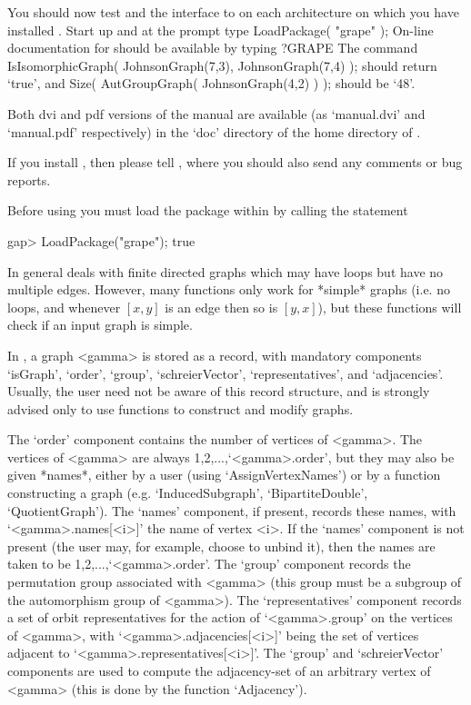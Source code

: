 You should now test {\GRAPE} and the interface to {\nauty} on each
architecture on which you have installed {\GRAPE}. Start up {\GAP}
and at the prompt type
\begintt
LoadPackage( "grape" );
\endtt
On-line documentation for {\GRAPE} should be available by typing 
\begintt
?GRAPE
\endtt
The command
\begintt
IsIsomorphicGraph( JohnsonGraph(7,3), JohnsonGraph(7,4) );
\endtt
should return `true', and 
\begintt
Size( AutGroupGraph( JohnsonGraph(4,2) ) );
\endtt
should be `48'.

Both dvi and pdf versions of the {\GRAPE} manual are available
(as `manual.dvi' and `manual.pdf' respectively) in the `doc' directory
of the home directory of {\GRAPE}.

If you install {\GRAPE}, then please tell ,
where you should also send any comments or bug reports.


Before using {\GRAPE} you must load the package within {\GAP} by calling 
the statement

\begintt
gap> LoadPackage("grape");
true
\endtt

 
In general {\GRAPE} deals with finite directed graphs which may have
loops but have no multiple edges. However, many {\GRAPE} functions only
work for *simple* graphs (i.e. no loops, and whenever $[x,y]$ is an
edge then so is $[y,x]$), but these functions will check if an input
graph is simple.

In {\GRAPE}, a graph <gamma> is stored as a record, with mandatory
components `isGraph', `order', `group', `schreierVector',
`representatives', and `adjacencies'. Usually, the user need not be
aware of this record structure, and is strongly advised only to use
{\GRAPE} functions to construct and modify graphs.

The `order' component contains the number of vertices of <gamma>. The
vertices of <gamma> are always 1,2,...,`<gamma>.order', but they may also
be given *names*, either by a user (using `AssignVertexNames') or by a
function constructing a graph (e.g. `InducedSubgraph', `BipartiteDouble',
`QuotientGraph'). The `names' component, if present, records these
names, with `<gamma>.names[<i>]' the name of vertex <i>.  If the `names'
component is not present (the user may, for example, choose to unbind
it), then the names are taken to be 1,2,...,`<gamma>.order'. The `group'
component records the {\GAP} permutation group associated with <gamma>
(this group must be a subgroup of the automorphism group of <gamma>). The
`representatives' component records a set of orbit representatives
for the action of `<gamma>.group' on the vertices of <gamma>, with
`<gamma>.adjacencies[<i>]' being the set of vertices adjacent to
`<gamma>.representatives[<i>]'. The `group' and `schreierVector'
components are used to compute the adjacency-set of an arbitrary vertex
of <gamma> (this is done by the function `Adjacency').

